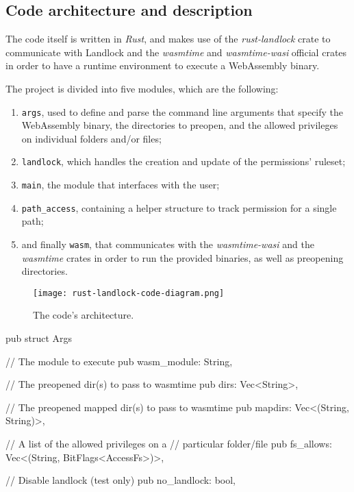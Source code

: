 \subsection{Code architecture and description}\label{sec:landlock-code-architecture}

The code itself is written in \textit{Rust}, and makes use of the
\textit{rust-landlock} \cite{rust-landlock} crate
to communicate with Landlock and the \textit{wasmtime} and \textit{wasmtime-wasi} official
crates in order to have a runtime environment to execute a WebAssembly binary.

The project is divided into five modules, which are the following:
\begin{enumerate}
  \item \texttt{args}, used to define and parse the command line arguments that specify the WebAssembly binary,
        the directories to preopen, and the allowed privileges on individual folders and/or files;
  \item \texttt{landlock}, which handles the creation and update of the permissions' ruleset;
  \item \texttt{main}, the module that interfaces with the user;
  \item \texttt{path\_access}, containing a helper structure to track permission for a single path;
  \item and finally \texttt{wasm}, that communicates with the \textit{wasmtime-wasi} and the \textit{wasmtime} crates
        in order to run the provided binaries, as well as preopening directories.
\end{enumerate}

\begin{figure}[ht]
  \centering
  \texttt{[image: rust-landlock-code-diagram.png]}
  \caption{The code's architecture.}
  \label{fig:rust-landlock-code-architecture}
\end{figure}

\begin{code}[language=rust, caption=The \texttt{Args} struct., label=lst:arg-struct]
pub struct Args {
  // The module to execute
  pub wasm_module: String,

  // The preopened dir(s) to pass to wasmtime
  pub dirs: Vec<String>,

  // The preopened mapped dir(s) to pass to wasmtime
  pub mapdirs: Vec<(String, String)>,

  // A list of the allowed privileges on a
  // particular folder/file
  pub fs_allows: Vec<(String, BitFlags<AccessFs>)>,

  // Disable landlock (test only)
  pub no_landlock: bool,
}
\end{code}

